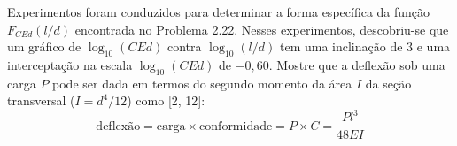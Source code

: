 Experimentos foram conduzidos para determinar a forma específica da função $F_{CEd}(l/d)$ encontrada no Problema 2.22. Nesses experimentos, descobriu-se que um gráfico de $\log_{10} (CEd)$ contra $\log_{10} (l / d)$ tem uma inclinação de $3$ e uma interceptação na escala $\log_{10} (CEd)$ de $-0,60$. Mostre que a deflexão sob uma carga $P$ pode ser dada em termos do segundo momento da área $I$ da seção transversal ($I = d^4/12$) como [2, 12]:
\begin{equation}
    \text{deflexão} = \text{carga} \times \text{conformidade} = P \times C = \frac{Pl^3}{48EI}
\end{equation}
